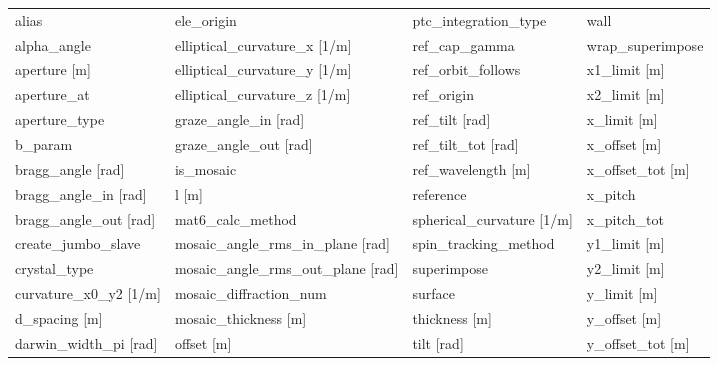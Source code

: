  \begin{tabular}{llll} \toprule
alias                            & ele_origin                       & ptc_integration_type             & wall                             \\
alpha_angle                      & elliptical_curvature_x [1/m]     & ref_cap_gamma                    & wrap_superimpose                 \\
aperture [m]                     & elliptical_curvature_y [1/m]     & ref_orbit_follows                & x1_limit [m]                     \\
aperture_at                      & elliptical_curvature_z [1/m]     & ref_origin                       & x2_limit [m]                     \\
aperture_type                    & graze_angle_in [rad]             & ref_tilt [rad]                   & x_limit [m]                      \\
b_param                          & graze_angle_out [rad]            & ref_tilt_tot [rad]               & x_offset [m]                     \\
bragg_angle [rad]                & is_mosaic                        & ref_wavelength [m]               & x_offset_tot [m]                 \\
bragg_angle_in [rad]             & l [m]                            & reference                        & x_pitch                          \\
bragg_angle_out [rad]            & mat6_calc_method                 & spherical_curvature [1/m]        & x_pitch_tot                      \\
create_jumbo_slave               & mosaic_angle_rms_in_plane [rad]  & spin_tracking_method             & y1_limit [m]                     \\
crystal_type                     & mosaic_angle_rms_out_plane [rad] & superimpose                      & y2_limit [m]                     \\
curvature_x0_y2 [1/m]            & mosaic_diffraction_num           & surface                          & y_limit [m]                      \\
d_spacing [m]                    & mosaic_thickness [m]             & thickness [m]                    & y_offset [m]                     \\
darwin_width_pi [rad]            & offset [m]                       & tilt [rad]                       & y_offset_tot [m]                 \\

\end{tabular}
